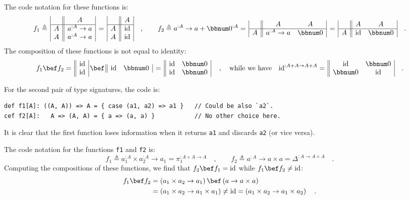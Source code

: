 The code notation for these functions is:
\[
f_{1}\triangleq\,\begin{array}{|c||c|}
 & A\\
\hline A & a^{:A}\rightarrow a\\
A & a^{:A}\rightarrow a
\end{array}\,=\,\begin{array}{|c||c|}
 & A\\
\hline A & \text{id}\\
A & \text{id}
\end{array}\quad,\quad\quad f_{2}\triangleq a^{:A}\rightarrow a+\bbnum 0^{:A}=\,\begin{array}{|c||cc|}
 & A & A\\
\hline A & a^{:A}\rightarrow a & \bbnum 0
\end{array}\,=\,\begin{array}{|c||cc|}
 & A & A\\
\hline A & \text{id} & \bbnum 0
\end{array}\quad.
\]
The composition of these functions is not equal to identity:
\[
f_{1}\bef f_{2}=\,\begin{array}{||c|}
\text{id}\\
\text{id}
\end{array}\,\bef\,\begin{array}{||cc|}
\text{id} & \bbnum 0\end{array}\,=\,\begin{array}{||cc|}
\text{id} & \bbnum 0\\
\text{id} & \bbnum 0
\end{array}\,\quad,\quad\text{while we have}\quad\text{id}^{:A+A\rightarrow A+A}=\,\begin{array}{||cc|}
\text{id} & \bbnum 0\\
\bbnum 0 & \text{id}
\end{array}\quad.
\]

For the second pair of type signatures, the code is:
\begin{lstlisting}
def f1[A]: ((A, A)) => A = { case (a1, a2) => a1 }   // Could be also `a2`.
cef f2[A]:   A => (A, A) = { a => (a, a) }           // No other choice here.
\end{lstlisting}
It is clear that the first function loses information when it returns
\lstinline!a1! and discards \lstinline!a2! (or vice versa).

The code notation for the functions \lstinline!f1! and \lstinline!f2!
is:
\[
f_{1}\triangleq a_{1}^{:A}\times a_{2}^{:A}\rightarrow a_{1}=\pi_{1}^{:A\times A\rightarrow A}\quad,\quad\quad f_{2}\triangleq a^{:A}\rightarrow a\times a=\Delta^{:A\rightarrow A\times A}\quad.
\]
Computing the compositions of these functions, we find that $f_{2}\bef f_{1}=\text{id}$
while $f_{1}\bef f_{2}\ne\text{id}$:
\begin{align*}
f_{1}\bef f_{2} & =\left(a_{1}\times a_{2}\rightarrow a_{1}\right)\bef\left(a\rightarrow a\times a\right)\\
 & =\left(a_{1}\times a_{2}\rightarrow a_{1}\times a_{1}\right)\neq\text{id}=\left(a_{1}\times a_{2}\rightarrow a_{1}\times a_{2}\right)\quad.
\end{align*}

